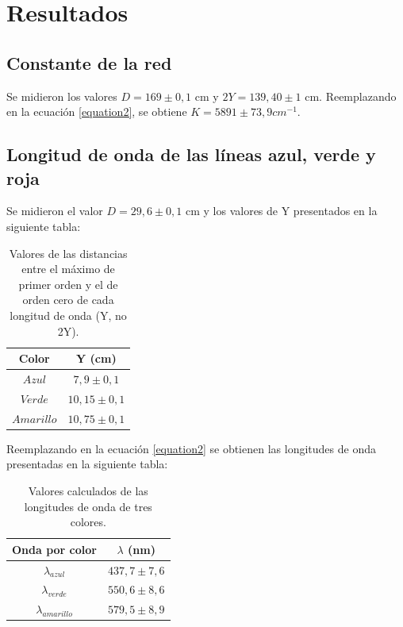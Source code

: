 \documentclass[12pt, a4paper]{article}
\begin{document}
\newpage
\section{Resultados}

\subsection{Constante de la red}
Se midieron los valores $D = 169 \pm 0,1$ cm y $2Y = 139,40 \pm 1$ cm. Reemplazando en la ecuación \ref{equation2},  se obtiene 
$K = 5891 \pm 73,9 cm^{-1}$.

\subsection{Longitud de onda de las líneas azul, verde y roja}
Se midieron el valor $D = 29,6 \pm 0,1$ cm y los valores de Y presentados en la siguiente tabla:

\begin{table}[H]
  \centering
  \begin{tabular}{|c|c|}
  \hline
  Color & Y (cm) \\
  \hline
  $Azul$  & $7,9 \pm 0,1$  \\ \hline
  $Verde$  & $10,15 \pm 0,1$ \\ \hline
  $Amarillo$  & $10,75 \pm 0,1$ \\ \hline
  \end{tabular}
  \caption{\centering Valores de las distancias entre el máximo de primer orden y el de orden cero de cada longitud de onda (Y, no 2Y).}
  \label{tabla1}
\end{table}

Reemplazando en la ecuación \ref{equation2} se obtienen las longitudes de onda presentadas en la siguiente tabla:

\begin{table}[H]
  \centering
  \begin{tabular}{|c|c|}
  \hline
  Onda por color & $\lambda $ (nm)  \\
  \hline
  ${\lambda_{azul}}$  & $ 437,7 \pm 7,6$  \\ \hline
  ${\lambda_{verde}}$  & $ 550,6 \pm 8,6 $ \\ \hline
  ${\lambda_{amarillo}}$  & $ 579,5 \pm 8,9 $\\ \hline
  \end{tabular}
  \caption{\centering Valores calculados de las longitudes de onda de tres colores. }
  \label{tabla2}
\end{table}
\end{document}
